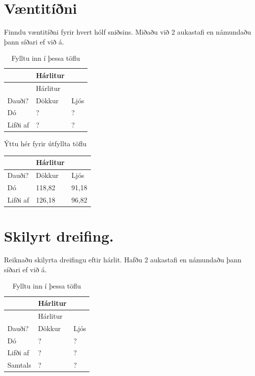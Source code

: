 \documentclass[
]{book}
\begin{document}
\hypertarget{vuxe6ntituxeduxf0ni}{%
\section{Væntitíðni}\label{vuxe6ntituxeduxf0ni}}

Finndu væntitíðni fyrir hvert hólf sniðsins. Miðaðu við 2 aukastafi en námundaðu þann síðari ef við á.

\begin{longtable}[]{@{}lll@{}}
\caption{Fylltu inn í þessa töflu}\tabularnewline
\toprule()
& Hárlitur & \\
\midrule()
\endfirsthead
\toprule()
& Hárlitur & \\
\midrule()
\endhead
Dauði? & Dökkur & Ljós \\
Dó & ? & ? \\
Lifði af & ? & ? \\
\bottomrule()
\end{longtable}

Ýttu hér fyrir útfyllta töflu

\begin{longtable}[]{@{}lll@{}}
\toprule()
& Hárlitur & \\
\midrule()
\endhead
Dauði? & Dökkur & Ljós \\
Dó & 118,82 & 91,18 \\
Lifði af & 126,18 & 96,82 \\
\bottomrule()
\end{longtable}

\hypertarget{skilyrt-dreifing.}{%
\section{Skilyrt dreifing.}\label{skilyrt-dreifing.}}

Reiknaðu skilyrta dreifingu eftir hárlit. Hafðu 2 aukastafi en námundaðu þann síðari ef við á.

\begin{longtable}[]{@{}lll@{}}
\caption{Fylltu inn í þessa töflu}\tabularnewline
\toprule()
& Hárlitur & \\
\midrule()
\endfirsthead
\toprule()
& Hárlitur & \\
\midrule()
\endhead
Dauði? & Dökkur & Ljós \\
Dó & ? & ? \\
Lifði af & ? & ? \\
Samtals & ? & ? \\
\bottomrule()
\end{longtable}
\end{document}
